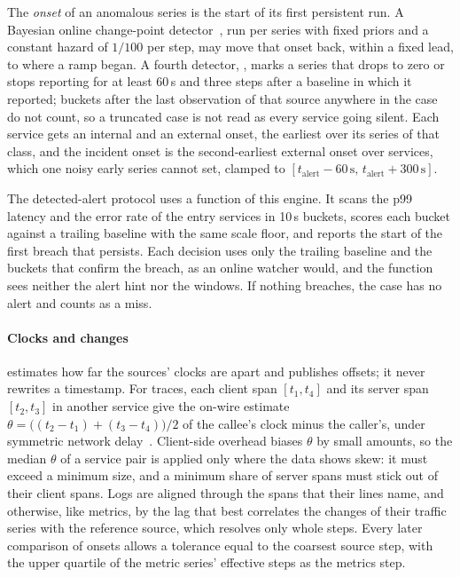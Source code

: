 The \emph{onset} of an anomalous series is the start of its first persistent run.
A Bayesian online change-point detector~\cite{bocpd}, run per series with fixed priors and a constant hazard of $1/100$ per step, may move that onset back, within a fixed lead, to where a ramp began.
A fourth detector, , marks a series that drops to zero or stops reporting for at least 60\,s and three steps after a baseline in which it reported; buckets after the last observation of that source anywhere in the case do not count, so a truncated case is not read as every service going silent.
Each service gets an internal and an external onset, the earliest over its series of that class, and the incident onset is the second-earliest external onset over services, which one noisy early series cannot set, clamped to $[t_\text{alert}-60\,\text{s},\, t_\text{alert}+300\,\text{s}]$.

The detected-alert protocol uses a function of this engine.
It scans the p99 latency and the error rate of the entry services in 10\,s buckets, scores each bucket against a trailing baseline with the same scale floor, and reports the start of the first breach that persists.
Each decision uses only the trailing baseline and the buckets that confirm the breach, as an online watcher would, and the function sees neither the alert hint nor the windows.
If nothing breaches, the case has no alert and counts as a miss.

\paragraph{Clocks and changes}
 estimates how far the sources' clocks are apart and publishes offsets; it never rewrites a timestamp.
For traces, each client span $[t_1, t_4]$ and its server span $[t_2, t_3]$ in another service give the on-wire estimate $\theta = \bigl((t_2 - t_1) + (t_3 - t_4)\bigr)/2$ of the callee's clock minus the caller's, under symmetric network delay~\cite{rfc5905}.
Client-side overhead biases $\theta$ by small amounts, so the median $\theta$ of a service pair is applied only where the data shows skew: it must exceed a minimum size, and a minimum share of server spans must stick out of their client spans.
Logs are aligned through the spans that their lines name, and otherwise, like metrics, by the lag that best correlates the changes of their traffic series with the reference source, which resolves only whole steps.
Every later comparison of onsets allows a tolerance equal to the coarsest source step, with the upper quartile of the metric series' effective steps as the metrics step.

